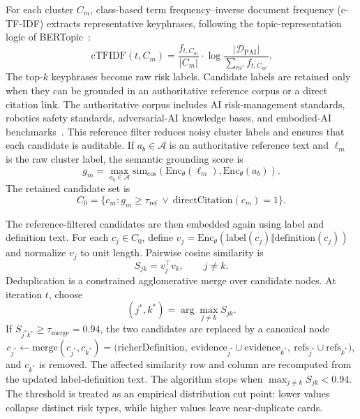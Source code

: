 \documentclass[11pt]{article}
\newcommand{\DPAI}{\mathcal{D}_{\mathrm{PAI}}}
\newcommand{\Enc}{\mathrm{Enc}_{\theta}}
\newcommand{\simcos}{\mathrm{sim}_{\cos}}
\begin{document}
For each cluster \(C_m\), class-based term frequency--inverse document frequency (c-TF-IDF) extracts representative keyphrases, following the topic-representation logic of BERTopic~\cite{grootendorst2022}:
\begin{equation}
  \mathrm{cTFIDF}(t,C_m)=
  \frac{f_{t,C_m}}{|C_m|}
  \cdot
  \log
  \frac{|\DPAI|}{\sum_{m'} f_{t,C_{m'}}}.
\end{equation}
The top-\(k\) keyphrases become raw risk labels. Candidate labels are retained only when they can be grounded in an authoritative reference corpus or a direct citation link. The authoritative corpus includes AI risk-management standards, robotics safety standards, adversarial-AI knowledge bases, and embodied-AI benchmarks~\cite{nist-airmf,iso23894,iso10218,iso5469,iso8200,mitre-atlas,sermanet-asimov,asimov2}. This reference filter reduces noisy cluster labels and ensures that each candidate is auditable. If \(a_b\in\mathcal{A}\) is an authoritative reference text and \(\ell_m\) is the raw cluster label, the semantic grounding score is
\begin{equation}
  g_m=\max_{a_b\in\mathcal{A}}
  \simcos\!\left(\Enc(\ell_m),\Enc(a_b)\right).
\end{equation}
The retained candidate set is
\begin{equation}
  C_0=\{c_m:g_m\geq\tau_{\mathrm{ref}}\ \lor\ \mathrm{directCitation}(c_m)=1\}.
\end{equation}

The reference-filtered candidates are then embedded again using label and definition text. For each \(c_j\in C_0\), define \(v_j=\Enc(\mathrm{label}(c_j)\Vert\mathrm{definition}(c_j))\) and normalize \(v_j\) to unit length. Pairwise cosine similarity is
\begin{equation}
  S_{jk}=v_j^{\top}v_k,\qquad j\neq k.
\end{equation}
Deduplication is a constrained agglomerative merge over candidate nodes. At iteration \(t\), choose
\begin{equation}
  (j^{\ast},k^{\ast})=\arg\max_{j\neq k}S_{jk}.
\end{equation}
If \(S_{j^{\ast}k^{\ast}}\geq\tau_{\mathrm{merge}}=0.94\), the two candidates are replaced by a canonical node
\begin{equation}
  c_{j^{\ast}}\leftarrow
  \mathrm{merge}(c_{j^{\ast}},c_{k^{\ast}})
  =
  \bigl(\mathrm{richerDefinition},\
  \mathrm{evidence}_{j^{\ast}}\cup\mathrm{evidence}_{k^{\ast}},\
  \mathrm{refs}_{j^{\ast}}\cup\mathrm{refs}_{k^{\ast}}\bigr),
\end{equation}
and \(c_{k^{\ast}}\) is removed. The affected similarity row and column are recomputed from the updated label-definition text. The algorithm stops when \(\max_{j\neq k}S_{jk}<0.94\). The threshold is treated as an empirical distribution cut point: lower values collapse distinct risk types, while higher values leave near-duplicate cards.
\end{document}
